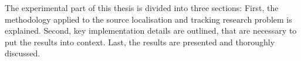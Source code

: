 The experimental part of this thesis is divided into three sections: First, the methodology applied to the source localisation and tracking research problem is explained. Second, key implementation details are outlined, that are necessary to put the results into context. Last, the results are presented and thoroughly discussed.